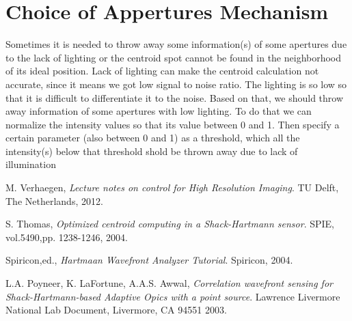 \documentclass{article}
\begin{document}
\section{Choice of Appertures Mechanism}

Sometimes it is needed to throw away some information(s) of some apertures due to the lack of lighting or the centroid spot cannot be found in the neighborhood of its ideal position. Lack of lighting can make the centroid calculation not accurate, since it means we got low signal to noise ratio. The lighting is so low so that it is difficult to differentiate it to the noise. Based on that, we should throw away information of some apertures with low lighting. To do that we can normalize the intensity values so that its value between 0 and 1. Then specify a certain parameter (also between 0 and 1) as a threshold, which all the intensity(s) below that threshold shold be thrown away due to lack of illumination


\begin{thebibliography}{9}

  M. Verhaegen,
  \emph{Lecture notes on control for High Resolution Imaging}.
  TU Delft, 
  The Netherlands,
  2012.
  
  S. Thomas,
  \emph{Optimized centroid computing in a Shack-Hartmann sensor}.
  SPIE, 
  vol.5490,pp. 1238-1246,
  2004. 
  
  Spiricon,ed.,
  \emph{Hartmaan Wavefront Analyzer Tutorial}.
  Spiricon, 
  2004.
  
  L.A. Poyneer, K. LaFortune, A.A.S. Awwal,
  \emph{Correlation wavefront sensing for Shack-Hartmann-based Adaptive Opics with a point source}.
  Lawrence Livermore National Lab Document,
  Livermore, CA 94551
  2003.  

\end{thebibliography}
\end{document}
